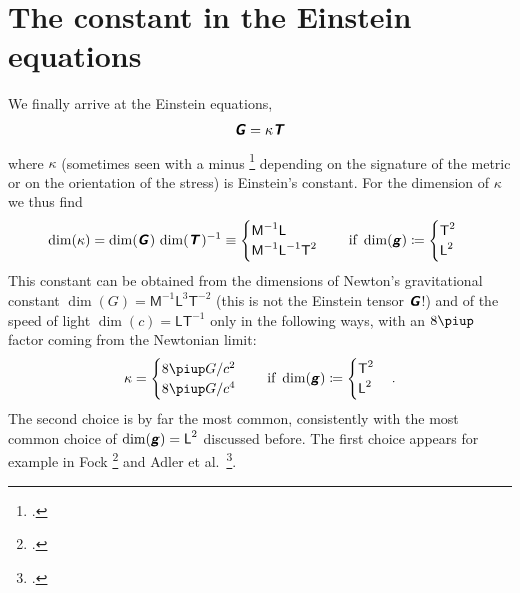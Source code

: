 \documentclass[\ifafour a4paper,12pt,\else a5paper,10pt,\fi%
onecolumn,oneside,article,%
british%
]{memoir}
\makeatletter
\theoremstyle{remark}
\theoremstyle{innote}
\newcommand*{\mathte}[1]{\textbf{\textit{\textsf{#1}}}}
\newcommand*{\citep}{\footcites}
\newcommand*{\pu}{\piup}%
\newcommand*{\defd}{\coloneqq}
\renewcommand*{\|}[1][]{\nonscript\,#1\vert\nonscript\;\mathopen{}}
\newcommand*{\sect}{\S}%
\newcommand*{\eqn}{eq.}%
\newcommand*{\eqns}{eqs}%
\newcommand*{\eg}{{e.g.}}
\newcommand*{\etal}{{et al.}}
\newcommand*{\q}{}%
\DeclareRobustCommand*{\q}{%
  \mathbin{\mathpalette\bigcdot@{}}%
}
\newcommand*{\bigcdot@scalefactor}{0.7}
\newcommand*{\bigcdot@widthfactor}{1.5}
\newcommand*{\bigcdot@}[2]{%
  \sbox0{$#1\vcenter{}$}%
  \sbox2{$#1\cdot\m@th$}%
  \hbox to \bigcdot@widthfactor\wd2{%
    \hfil
    \raise\ht0\hbox{%
      \scalebox{\bigcdot@scalefactor}{%
        \lower\ht0\hbox{$#1\bullet\m@th$}%
      }%
    }%
    \hfil
  }%
}
\newcommand*{\Le}{\textsf{L}}
\newcommand*{\Ti}{\textsf{T}}
\newcommand*{\Ma}{\textsf{M}}
\newcommand*{\yg}{\mathte{g}}
\newcommand*{\yT}{\mathte{T}}
\newcommand*{\yG}{\mathte{G}}
\renewcommand*{\i}{\indices}
\newcommand*{\yk}{\kappa}
\makeatother
\begin{document}
\section{The constant in the Einstein equations}
\label{sec:einstein_eq}

We finally arrive at the Einstein equations,
\begin{equation}
  \label{eq:einstein}
  \yG%
  = \yk \yT%
\end{equation}
where $\yk$ (sometimes seen with a minus \citep[\eg][\sect~78
\eqn~(78.3)]{tolman1934_t1949}[\sect~52
\eqn~(52.06)]{fock1955_t1964}[\sect~14.2 \eqn~(14.8)]{rindler2001_r2006}
depending on the signature of the metric or on the orientation of the
stress) is Einstein's constant. For the dimension of $\yk$ we thus find
\begin{equation}
  \label{eq:dim_k_1}
  \dim(\yk) = \dim(\yG\i{_{\q}^{\q}}) \, \dim(\yT\i{_{\q}^{\q}})^{-1} \equiv
    \begin{cases}
    \Ma^{-1}\Le \\
    \Ma^{-1}\Le^{-1}\Ti^{2}
  \end{cases}
  \quad\text{if }\dim(\yg)\defd
  \begin{cases}
     \Ti^2 \\
    \Le^2
  \end{cases}
\end{equation}
This constant can be obtained from the dimensions of Newton's gravitational
constant $\dim(G)=\Ma^{-1}\Le^{3}\Ti^{-2}$ (this is not the Einstein tensor
$\yG$!) and of the speed of light $\dim(c)=\Le\Ti^{-1}$ only in the
following ways, with an $8\pu$ factor coming from the Newtonian limit:
\begin{equation}
  \label{eq:k_Gc}
  \yk =     \begin{cases}
   8\pu G/c^{2} \\
   8\pu G/c^{4}
  \end{cases}
  \quad\text{if }\dim(\yg)\defd
  \begin{cases}
     \Ti^2 \\
    \Le^2
  \end{cases}.
\end{equation}
The second choice is by far the most common, consistently with the most
common choice of $\dim(\yg)=\Le^{2}$ discussed before. The first choice
appears for example in Fock \citep[\sect~55 \eqns~(55.15)
and~(52.06)]{fock1955_t1964} and Adler \etal\ \citep[\sect~10.5
\eqn~(10.98)]{adleretal1965_r1975}.

\end{document}
